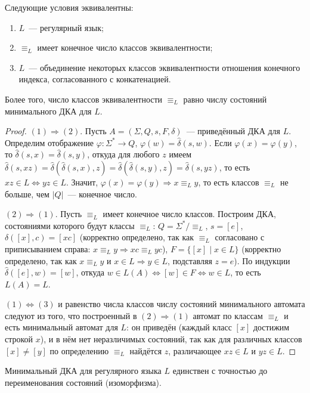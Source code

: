 \documentclass[12pt]{article}
\begin{document}
	\begin{theorem}
		Следующие условия эквивалентны:
		\begin{enumerate}
			\item $L$~--- регулярный язык;
			\item $\equiv_L$ имеет конечное число классов эквивалентности;
			\item $L$~--- объединение некоторых классов эквивалентности отношения конечного индекса, согласованного с конкатенацией.
		\end{enumerate}
		Более того, число классов эквивалентности $\equiv_L$ равно числу состояний минимального ДКА для $L$.
	\end{theorem}
	
	\begin{proof}
		$(1) \Rightarrow (2)$. Пусть $A = (\Sigma, Q, s, F, \delta)$~--- приведённый ДКА для $L$. Определим отображение $\varphi: \Sigma^* \rightarrow Q$, $\varphi(w) = \hat\delta(s, w)$. Если $\varphi(x) = \varphi(y)$, то $\hat\delta(s, x) = \hat\delta(s, y)$, откуда для любого $z$ имеем $\hat\delta(s, xz) = \hat\delta(\hat\delta(s,x), z) = \hat\delta(\hat\delta(s,y), z) = \hat\delta(s, yz)$, то есть $xz \in L \Leftrightarrow yz \in L$. Значит, $\varphi(x) = \varphi(y) \Rightarrow x \equiv_L y$, то есть классов $\equiv_L$ не больше, чем $|Q|$~--- конечное число.
		
		$(2) \Rightarrow (1)$. Пусть $\equiv_L$ имеет конечное число классов. Построим ДКА, состояниями которого будут классы $\equiv_L$: $Q = \Sigma^*/{\equiv_L}$, $s = [e]$, $\delta([x], c) = [xc]$ (корректно определено, так как $\equiv_L$ согласовано с приписыванием справа: $x \equiv_L y \Rightarrow xc \equiv_L yc$), $F = \{ [x] \mid x \in L \}$ (корректно определено, так как $x \equiv_L y$ и $x \in L \Rightarrow y \in L$, подставляя $z = e$). По индукции $\hat\delta([e], w) = [w]$, откуда $w \in L(A) \Leftrightarrow [w] \in F \Leftrightarrow w \in L$, то есть $L(A) = L$.
		
		$(1) \Leftrightarrow (3)$ и равенство числа классов числу состояний минимального автомата следуют из того, что построенный в $(2) \Rightarrow (1)$ автомат по классам $\equiv_L$ и есть минимальный автомат для $L$: он приведён (каждый класс $[x]$ достижим строкой $x$), и в нём нет неразличимых состояний, так как для различных классов $[x] \neq [y]$ по определению $\equiv_L$ найдётся $z$, различающее $xz \in L$ и $yz \in L$.
	\end{proof}
	
	\begin{statement}
		Минимальный ДКА для регулярного языка $L$ единствен с точностью до переименования состояний (изоморфизма).
	\end{statement}
	
\end{document}
